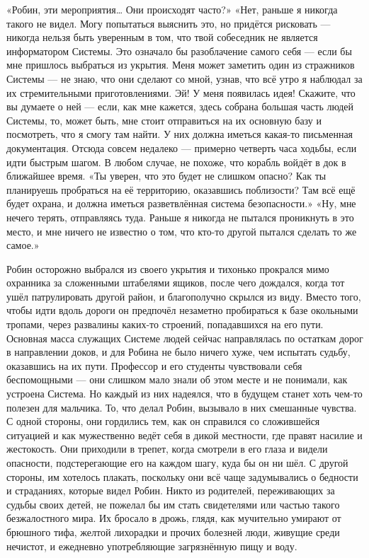 \documentclass[a4paper,12pt]{book}
\begin{document}
	«Робин, эти мероприятия… Они происходят часто?»
	«Нет, раньше я никогда такого не видел. Могу попытаться выяснить это, но придётся рисковать — никогда нельзя быть уверенным в том, что твой собеседник не является информатором Системы. Это означало бы разоблачение самого себя — если бы мне пришлось выбраться из укрытия. Меня может заметить один из стражников Системы — не знаю, что они сделают со мной, узнав, что всё утро я наблюдал за их стремительными приготовлениями. Эй! У меня появилась идея! Скажите, что вы думаете о ней — если, как мне кажется, здесь собрана большая часть людей Системы, то, может быть, мне стоит отправиться на их основную базу и посмотреть, что я смогу там найти. У них должна иметься какая-то письменная документация. Отсюда совсем недалеко — примерно четверть часа ходьбы, если идти быстрым шагом. В любом случае, не похоже, что корабль войдёт в док в ближайшее время.
	«Ты уверен, что это будет не слишком опасно? Как ты планируешь пробраться на её территорию, оказавшись поблизости? Там всё ещё будет охрана, и должна иметься разветвлённая система безопасности.»
	«Ну, мне нечего терять, отправляясь туда. Раньше я никогда не пытался проникнуть в это место, и мне ничего не известно о том, что кто-то другой пытался сделать то же самое.»

	Робин осторожно выбрался из своего укрытия и тихонько прокрался мимо охранника за сложенными штабелями ящиков, после чего дождался, когда тот ушёл патрулировать другой район, и благополучно скрылся из виду.
	Вместо того, чтобы идти вдоль дороги он предпочёл незаметно пробираться к базе окольными тропами, через развалины каких-то строений, попадавшихся на его пути. Основная масса служащих Системе людей сейчас направлялась по остаткам дорог в направлении доков, и для Робина не было ничего хуже, чем испытать судьбу, оказавшись на их пути.
	Профессор и его студенты чувствовали себя беспомощными — они слишком мало знали об этом месте и не понимали, как устроена Система. Но каждый из них надеялся, что в будущем станет хоть чем-то полезен для мальчика. То, что делал Робин, вызывало в них смешанные чувства. С одной стороны, они гордились тем, как он справился со сложившейся ситуацией и как мужественно ведёт себя в дикой местности, где правят насилие и жестокость. Они приходили в трепет, когда смотрели в его глаза и видели опасности, подстерегающие его на каждом шагу, куда бы он ни шёл. С другой стороны, им хотелось плакать, поскольку они всё чаще задумывались о бедности и страданиях, которые видел Робин. Никто из родителей, переживающих за судьбы своих детей, не пожелал бы им стать свидетелями или частью такого безжалостного мира. Их бросало в дрожь, глядя, как мучительно умирают от брюшного тифа, желтой лихорадки и прочих болезней люди, живущие среди нечистот, и ежедневно употребляющие загрязнённую пищу и воду.
\end{document}
